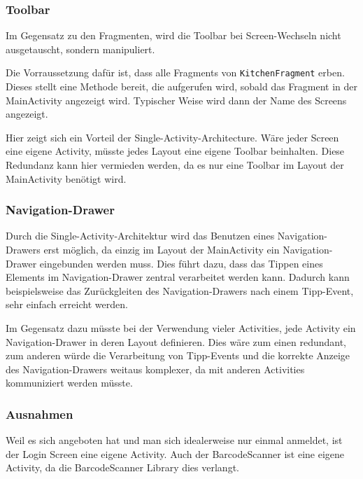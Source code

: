 

\subsubsection{Toolbar}

Im Gegensatz zu den Fragmenten, wird die Toolbar bei Screen-Wechseln nicht ausgetauscht, sondern manipuliert.

Die Vorraussetzung dafür ist, dass alle Fragments von \texttt{KitchenFragment} erben.
Dieses stellt eine Methode bereit, die aufgerufen wird, sobald das Fragment in der MainActivity angezeigt wird.
Typischer Weise wird dann der Name des Screens angezeigt.

Hier zeigt sich ein Vorteil der Single-Activity-Architecture.
Wäre jeder Screen eine eigene Activity, müsste jedes Layout eine eigene Toolbar beinhalten.
Diese Redundanz kann hier vermieden werden, da es nur eine Toolbar im Layout der MainActivity benötigt wird.

\subsubsection{Navigation-Drawer}

Durch die Single-Activity-Architektur wird das Benutzen eines Navigation-Drawers erst möglich, da einzig im Layout der MainActivity ein Navigation-Drawer eingebunden werden muss.
Dies führt dazu, dass das Tippen eines Elements im Navigation-Drawer zentral verarbeitet werden kann.
Dadurch kann beispielsweise das Zurückgleiten des Navigation-Drawers nach einem Tipp-Event, sehr einfach erreicht werden.

Im Gegensatz dazu müsste bei der Verwendung vieler Activities, jede Activity ein Navigation-Drawer in deren Layout definieren.
Dies wäre zum einen redundant, zum anderen würde die Verarbeitung von Tipp-Events und die korrekte Anzeige des Navigation-Drawers weitaus komplexer, da mit anderen Activities kommuniziert werden müsste.

\subsubsection{Ausnahmen}

Weil es sich angeboten hat und man sich idealerweise nur einmal anmeldet, ist der Login Screen eine eigene Activity.
Auch der BarcodeScanner ist eine eigene Activity, da die BarcodeScanner Library dies verlangt.

